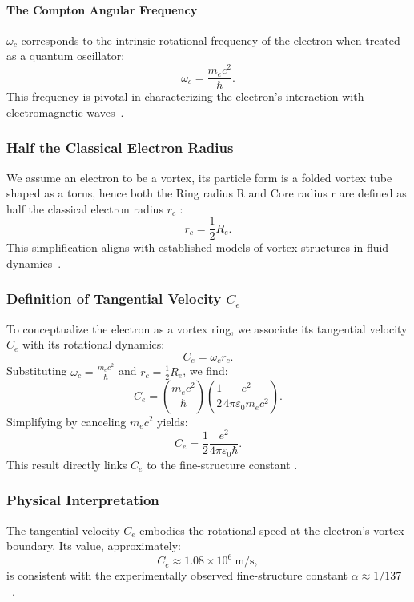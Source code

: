 \paragraph*{The Compton Angular Frequency}
 $\omega_c$ corresponds to the intrinsic rotational frequency of the electron when treated as a quantum oscillator:
\begin{equation*}
    \omega_c = \frac{m_e c^2}{\hbar}.
\end{equation*}
This frequency is pivotal in characterizing the electron’s interaction with electromagnetic waves~\cite{kelvin1867}.

\subsubsection*{Half the Classical Electron Radius}
We assume an electron to be a vortex, its particle form is a folded vortex tube shaped as a torus, hence both the Ring radius R and Core radius r are defined as half the classical electron radius  $r_c$ :
\begin{equation*}
    r_c = \frac{1}{2} R_e.
\end{equation*}
This simplification aligns with established models of vortex structures in fluid dynamics~\cite{kleckner2013}.

\subsubsection*{Definition of Tangential Velocity $C_e$}
To conceptualize the electron as a vortex ring, we associate its tangential velocity $C_e$ with its rotational dynamics:
\begin{equation}
    C_e = \omega_c r_c.
\end{equation}
Substituting $\omega_c = \frac{m_e c^2}{\hbar}$ and $r_c = \frac{1}{2} R_e$, we find:
\begin{equation*}
    C_e = \left( \frac{m_e c^2}{\hbar} \right) \left( \frac{1}{2} \frac{e^2}{4\pi \varepsilon_0 m_e c^2} \right).
\end{equation*}
Simplifying by canceling $m_e c^2$ yields:
\begin{equation*}
    C_e = \frac{1}{2} \frac{e^2}{4\pi \varepsilon_0 \hbar}.\label{eq:C_e-from-compton}
\end{equation*}
This result directly links $C_e$ to the fine-structure constant \cite{vinen2024}.

\subsubsection*{Physical Interpretation}
The tangential velocity $C_e$ embodies the rotational speed at the electron’s vortex boundary. Its value, approximately:
\begin{equation*}
    C_e \approx 1.08 \times 10^6 \ \text{m/s},
\end{equation*}
is consistent with the experimentally observed fine-structure constant $\alpha \approx 1/137$~\cite{ricca1998}.

